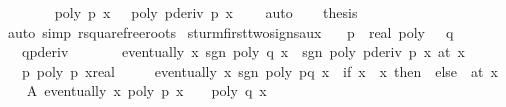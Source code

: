 \begin{isabellebody}
\ \ \ \ \ \ \isamarkupfalse%
\ {\isachardoublequoteopen}poly\ p\ x\ {\isacharequal}\ {}{\isachardoublequoteclose}\ {\isachardoublequoteopen}poly\ {\isacharparenleft}pderiv\ p{\isacharparenright}\ x\ {\isacharequal}\ {}{\isachardoublequoteclose}\ \isamarkupfalse%
\ auto\isanewline
\ \ \isamarkupfalse%
\ {\isacharquery}thesis\ \isamarkupfalse%
\ {\isacharparenleft}auto\ simp{\isacharcolon}\ rsquarefree{\isacharunderscore}roots{\isacharparenright}\isanewline
{}\isamarkupfalse%
%
\endisatagproof
{\isafoldproof}%
%
\isadelimproof
\isanewline
%
\endisadelimproof
\isanewline
\isanewline
{}\isamarkupfalse%
\ sturm{\isacharunderscore}firsttwo{\isacharunderscore}signs{\isacharunderscore}aux{\isacharcolon}\isanewline
\ \ \ {\isachardoublequoteopen}{\isacharparenleft}p\ {\isacharcolon}{\isacharcolon}\ real\ poly{\isacharparenright}\ {\isasymnoteq}\ {}{\isachardoublequoteclose}\ {\isachardoublequoteopen}q\ {\isasymnoteq}\ {}{\isachardoublequoteclose}\isanewline
\ \ \ q{\isacharunderscore}pderiv{\isacharcolon}\ \isanewline
\ \ \ \ \ \ {\isachardoublequoteopen}eventually\ {\isacharparenleft}{\isasymlambda}x{\isachardot}\ sgn\ {\isacharparenleft}poly\ q\ x{\isacharparenright}\ {\isacharequal}\ sgn\ {\isacharparenleft}poly\ {\isacharparenleft}pderiv\ p{\isacharparenright}\ x{\isacharparenright}{\isacharparenright}\ {\isacharparenleft}at\ x\isanewline
\ \ \ p{\isacharunderscore}{}{\isacharcolon}\ {\isachardoublequoteopen}poly\ p\ {\isacharparenleft}xreal{\isacharparenright}\ {\isacharequal}\ {}{\isachardoublequoteclose}\isanewline
\ \ \ {\isachardoublequoteopen}eventually\ {\isacharparenleft}{\isasymlambda}x{\isachardot}\ sgn\ {\isacharparenleft}poly\ {\isacharparenleft}p{\isacharasterisk}q{\isacharparenright}\ x{\isacharparenright}\ {\isacharequal}\ {\isacharparenleft}if\ x\ {\isachargreater}\ x\ then\ {}\ else\ {\isacharminus}{}{\isacharparenright}{\isacharparenright}\ {\isacharparenleft}at\ x\isanewline
%
\isadelimproof
%
\endisadelimproof
%
\isatagproof
{}\isamarkupfalse%
{\isacharminus}\isanewline
\ \ \isamarkupfalse%
\ A{\isacharcolon}\ {\isachardoublequoteopen}eventually\ {\isacharparenleft}{\isasymlambda}x{\isachardot}\ poly\ p\ x\ {\isasymnoteq}\ {}\ {\isasymand}\ poly\ q\ x\ {\isasymnoteq}\ {}\ {\isasymand}\isanewline

\end{isabellebody}
